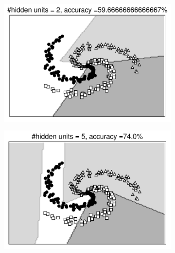 \begin{figure}[t]
    \begin{subfigure}{0.45\textwidth}
    \includegraphics[width=0.99\linewidth]{ebookML_src/src/mlp/ex_res2.pdf}
    \caption{}
    \end{subfigure}
    \begin{subfigure}{0.45\textwidth}
    \includegraphics[width=0.99\linewidth]{ebookML_src/src/mlp/ex_res5.pdf}
    \caption{}
    \end{subfigure}


\end{figure}
